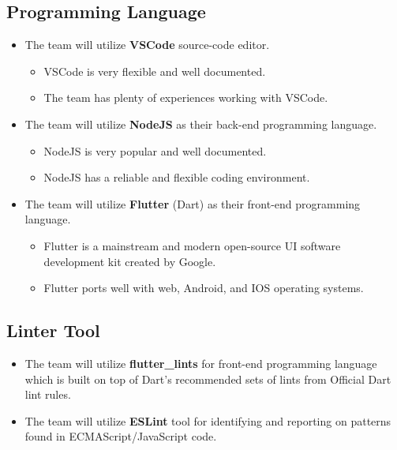 \documentclass{article}
\begin{document}
\subsection{Programming Language}
    \begin{itemize}
        \item The team will utilize \textbf{VSCode} source-code editor.
        \begin{itemize}
            \item VSCode is very flexible and well documented.
            \item The team has plenty of experiences working with VSCode.
        \end{itemize}
        \item The team will utilize \textbf{NodeJS} as their back-end programming language.
        \begin{itemize}
            \item NodeJS is very popular and well documented.
            \item NodeJS has a reliable and flexible coding environment.
        \end{itemize}
        \item The team will utilize \textbf{Flutter} (Dart) as their front-end programming language.
        \begin{itemize}
            \item Flutter is a mainstream and modern open-source UI software development kit created by Google.
            \item Flutter ports well with web, Android, and IOS operating systems.
        \end{itemize}
    \end{itemize}
\subsection{Linter Tool}
    \begin{itemize}
        \item The team will utilize \textbf{flutter\_lints} for front-end programming language which is built on top of Dart's recommended sets of lints from Official Dart lint rules.
        \item The team will utilize \textbf{ESLint} tool for identifying and reporting on patterns found in ECMAScript/JavaScript code.
    \end{itemize}
\end{document}
